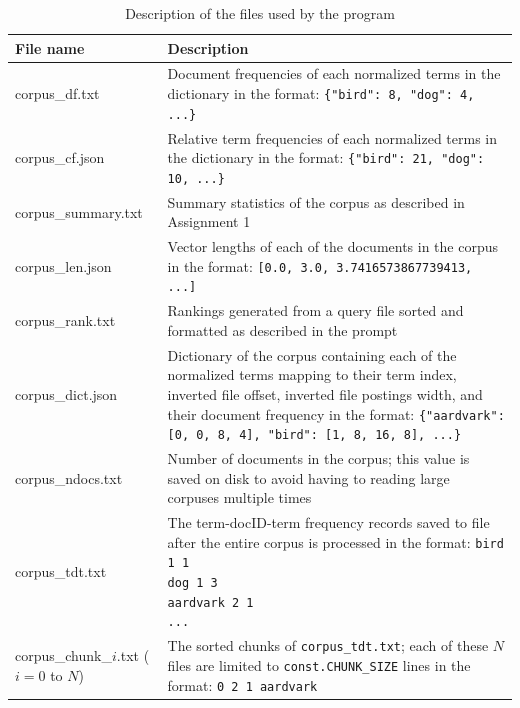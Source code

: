 \documentclass[11pt]{article}
\begin{document}
\begin{table}[!ht]
    \caption{Description of the files used by the program}
    \begin{center} \label{files}
        
        \begin{tabular}{| L{3.5cm} | L{12cm} |}
        \hline
        \textbf{File name} & \textbf{Description}
        \\ \hline
        corpus\_df.txt & Document frequencies of each normalized terms in the dictionary in the format: \newline \texttt{\{"bird": 8, "dog": 4, ...\}}
        \\ \hline
        corpus\_cf.json & Relative term frequencies of each normalized terms in the dictionary in the format: \newline \texttt{\{"bird": 21, "dog": 10, ...\}}
        \\ \hline
        corpus\_summary.txt & Summary statistics of the corpus as described in Assignment 1
        \\ \hline
        corpus\_len.json & Vector lengths of each of the documents in the corpus in the format: \newline \texttt{{[0.0, 3.0, 3.7416573867739413, ...]}}
        \\ \hline
        corpus\_rank.txt & Rankings generated from a query file sorted and formatted as described in the prompt
        \\ \hline
        corpus\_dict.json & Dictionary of the corpus containing each of the normalized terms mapping to their term index, inverted file offset, inverted file postings width, and their document frequency in the format: \newline \texttt{\{"aardvark": [0, 0, 8, 4], "bird": [1, 8, 16, 8], ...\}}
        \\ \hline
        corpus\_ndocs.txt & Number of documents in the corpus; this value is saved on disk to avoid having to reading large corpuses multiple times
        \\ \hline
        corpus\_tdt.txt & The term-docID-term frequency records saved to file after the entire corpus is processed in the format: \newline \texttt{bird 1 1 \newline
        dog 1 3 \newline
        aardvark 2 1 \newline
        ...}
        \\ \hline
        corpus\_chunk\_$i$.txt ($i=0$ to $N$) & The sorted chunks of \texttt{corpus\_tdt.txt}; each of these  $N$ files are limited to \texttt{const.CHUNK\_SIZE} lines in the format: \newline \texttt{0 2 1 aardvark \newline
}
\end{tabular}
\end{center}
\end{table}
\end{document}

